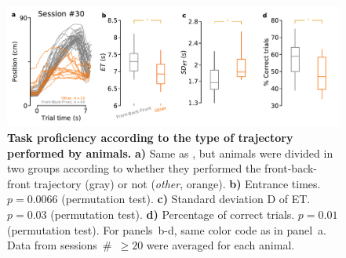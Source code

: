 \begin{figure}[!h]
	\begin{center}
		\includegraphics[width=\textwidth]{ch-appendicies/figures/BadCtrl.pdf}
		\caption[Different Control Trajectory Groups]
		{\textbf{Task proficiency according to the type of trajectory performed by animals.}
		\textbf{a)}
		Same as , but animals were divided in two groups according to whether they performed the front-back-front trajectory (gray) or not (\textit{other}, orange).
		\textbf{b)}
		Entrance times.
		$p=0.0066$ (permutation test).
		\textbf{c)}
		Standard deviation D of ET.
		$p=0.03$ (permutation test).
		\textbf{d)}
		Percentage of correct trials.
		$p=0.01$ (permutation test).
		For panels~b-d, same color code as in panel~a.
		Data from sessions~\#~$\geq20$ were averaged for each animal.
		}
		\label{fig:appendix:BadCtrl}
	\end{center}
\end{figure}